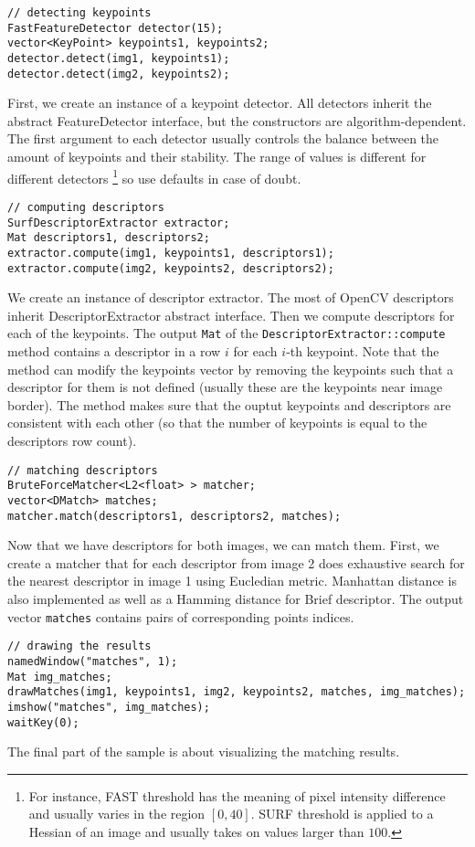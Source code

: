 \begin{lstlisting}
// detecting keypoints
FastFeatureDetector detector(15);
vector<KeyPoint> keypoints1, keypoints2;
detector.detect(img1, keypoints1);
detector.detect(img2, keypoints2);
\end{lstlisting}
First, we create an instance of a keypoint detector. All detectors inherit the abstract FeatureDetector interface, but the constructors are algorithm-dependent. The first argument to each detector usually controls the balance between the amount of keypoints and their stability. The range of values is different for different detectors \footnote{For instance, FAST threshold has the meaning of pixel intensity difference and usually varies in the region \([0,40]\). SURF threshold is applied to a Hessian of an image and usually takes on values larger than \(100\).} so use defaults in case of doubt. 

\begin{lstlisting}
// computing descriptors
SurfDescriptorExtractor extractor;
Mat descriptors1, descriptors2;
extractor.compute(img1, keypoints1, descriptors1);
extractor.compute(img2, keypoints2, descriptors2);
\end{lstlisting}
We create an instance of descriptor extractor. The most of OpenCV descriptors inherit DescriptorExtractor abstract interface. Then we compute descriptors for each of the keypoints. The output \texttt{Mat} of the \texttt{DescriptorExtractor::compute} method contains a descriptor in a row \(i\) for each \(i\)-th keypoint. Note that the method can modify the keypoints vector by removing the keypoints such that a descriptor for them is not defined (usually these are the keypoints near image border). The method makes sure that the ouptut keypoints and descriptors are consistent with each other (so that the number of keypoints is equal to the descriptors row count). 

\begin{lstlisting}
// matching descriptors
BruteForceMatcher<L2<float> > matcher;
vector<DMatch> matches;
matcher.match(descriptors1, descriptors2, matches);
\end{lstlisting}
Now that we have descriptors for both images, we can match them. First, we create a matcher that for each descriptor from image 2 does exhaustive search for the nearest descriptor in image 1 using Eucledian metric. Manhattan distance is also implemented as well as a Hamming distance for Brief descriptor. The output vector \texttt{matches} contains pairs of corresponding points indices. 

\begin{lstlisting}
// drawing the results
namedWindow("matches", 1);
Mat img_matches;
drawMatches(img1, keypoints1, img2, keypoints2, matches, img_matches);
imshow("matches", img_matches);
waitKey(0);
\end{lstlisting}
The final part of the sample is about visualizing the matching results.
\fi